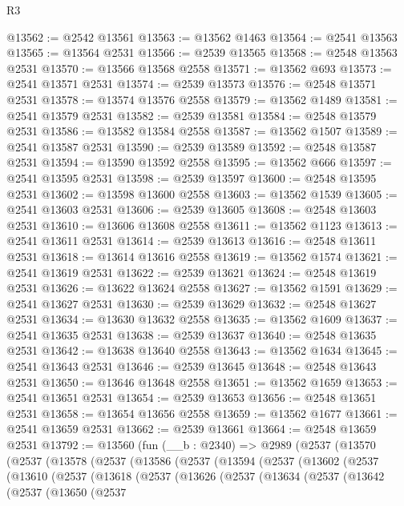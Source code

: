 \begin{lexlean}{R3}
\begin{coremodule}
@13562 := @2542 @13561
@13563 := @13562 @1463
@13564 := @2541 @13563
@13565 := @13564 @2531
@13566 := @2539 @13565
@13568 := @2548 @13563 @2531
@13570 := @13566 @13568 @2558
@13571 := @13562 @693
@13573 := @2541 @13571 @2531
@13574 := @2539 @13573
@13576 := @2548 @13571 @2531
@13578 := @13574 @13576 @2558
@13579 := @13562 @1489
@13581 := @2541 @13579 @2531
@13582 := @2539 @13581
@13584 := @2548 @13579 @2531
@13586 := @13582 @13584 @2558
@13587 := @13562 @1507
@13589 := @2541 @13587 @2531
@13590 := @2539 @13589
@13592 := @2548 @13587 @2531
@13594 := @13590 @13592 @2558
@13595 := @13562 @666
@13597 := @2541 @13595 @2531
@13598 := @2539 @13597
@13600 := @2548 @13595 @2531
@13602 := @13598 @13600 @2558
@13603 := @13562 @1539
@13605 := @2541 @13603 @2531
@13606 := @2539 @13605
@13608 := @2548 @13603 @2531
@13610 := @13606 @13608 @2558
@13611 := @13562 @1123
@13613 := @2541 @13611 @2531
@13614 := @2539 @13613
@13616 := @2548 @13611 @2531
@13618 := @13614 @13616 @2558
@13619 := @13562 @1574
@13621 := @2541 @13619 @2531
@13622 := @2539 @13621
@13624 := @2548 @13619 @2531
@13626 := @13622 @13624 @2558
@13627 := @13562 @1591
@13629 := @2541 @13627 @2531
@13630 := @2539 @13629
@13632 := @2548 @13627 @2531
@13634 := @13630 @13632 @2558
@13635 := @13562 @1609
@13637 := @2541 @13635 @2531
@13638 := @2539 @13637
@13640 := @2548 @13635 @2531
@13642 := @13638 @13640 @2558
@13643 := @13562 @1634
@13645 := @2541 @13643 @2531
@13646 := @2539 @13645
@13648 := @2548 @13643 @2531
@13650 := @13646 @13648 @2558
@13651 := @13562 @1659
@13653 := @2541 @13651 @2531
@13654 := @2539 @13653
@13656 := @2548 @13651 @2531
@13658 := @13654 @13656 @2558
@13659 := @13562 @1677
@13661 := @2541 @13659 @2531
@13662 := @2539 @13661
@13664 := @2548 @13659 @2531
@13792 := @13560
    (fun (__b : @2340) =>
    @2989
      (@2537
        (@13570
          (@2537
            (@13578
              (@2537
                (@13586
                  (@2537
                    (@13594
                      (@2537
                        (@13602
                          (@2537
                            (@13610
                              (@2537
                                (@13618
                                  (@2537
                                    (@13626
                                      (@2537
                                        (@13634
                                          (@2537
                                            (@13642
                                              (@2537
                                                (@13650
                                                  (@2537

\end{coremodule}
\end{lexlean}
